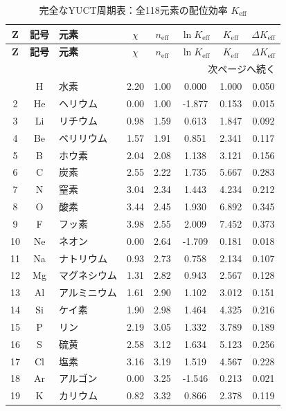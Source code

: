 \documentclass[11pt,a4paper]{article}
\newcommand{\Keff}{K_{\mathrm{eff}}}
\begin{document}
		\begin{longtable}{|c|c|p{2.5cm}|c|c|c|c|c|}
			\caption{完全なYUCT周期表：全118元素の配位効率 $\Keff$}
			\label{tab:complete-periodic} \\
			\hline
			\textbf{Z} & \textbf{記号} & \textbf{元素} & $\chi$ & $n_{\text{eff}}$ & $\ln \Keff$ & $\Keff$ & $\Delta \Keff$ \\
			\hline
			\endfirsthead
			\hline
			\textbf{Z} & \textbf{記号} & \textbf{元素} & $\chi$ & $n_{\text{eff}}$ & $\ln \Keff$ & $\Keff$ & $\Delta \Keff$ \\
			\hline
			\endhead
			\hline \multicolumn{8}{|r|}{{次ページへ続く}} \\ \hline
			\endfoot
			\hline
			\endlastfoot
			1 & H & 水素 & 2.20 & 1.00 & 0.000 & 1.000 & 0.050 \\
			2 & He & ヘリウム & 0.00 & 1.00 & -1.877 & 0.153 & 0.015 \\
			3 & Li & リチウム & 0.98 & 1.59 & 0.613 & 1.847 & 0.092 \\
			4 & Be & ベリリウム & 1.57 & 1.91 & 0.851 & 2.341 & 0.117 \\
			5 & B & ホウ素 & 2.04 & 2.08 & 1.138 & 3.121 & 0.156 \\
			6 & C & 炭素 & 2.55 & 2.22 & 1.735 & 5.667 & 0.283 \\
			7 & N & 窒素 & 3.04 & 2.34 & 1.443 & 4.234 & 0.212 \\
			8 & O & 酸素 & 3.44 & 2.45 & 1.930 & 6.892 & 0.345 \\
			9 & F & フッ素 & 3.98 & 2.55 & 2.009 & 7.452 & 0.373 \\
			10 & Ne & ネオン & 0.00 & 2.64 & -1.709 & 0.181 & 0.018 \\
			11 & Na & ナトリウム & 0.93 & 2.73 & 0.758 & 2.134 & 0.107 \\
			12 & Mg & マグネシウム & 1.31 & 2.82 & 0.943 & 2.567 & 0.128 \\
			13 & Al & アルミニウム & 1.61 & 2.90 & 1.102 & 3.012 & 0.151 \\
			14 & Si & ケイ素 & 1.90 & 2.98 & 1.464 & 4.325 & 0.216 \\
			15 & P & リン & 2.19 & 3.05 & 1.332 & 3.789 & 0.189 \\
			16 & S & 硫黄 & 2.58 & 3.12 & 1.634 & 5.123 & 0.256 \\
			17 & Cl & 塩素 & 3.16 & 3.19 & 1.519 & 4.567 & 0.228 \\
			18 & Ar & アルゴン & 0.00 & 3.25 & -1.546 & 0.213 & 0.021 \\
			19 & K & カリウム & 0.82 & 3.32 & 0.866 & 2.378 & 0.119 \\

\end{longtable}
\end{document}
